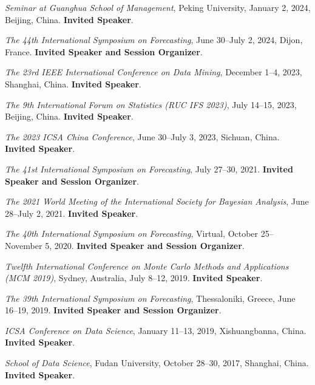 \documentclass[twoside,a4paper]{article}
\begin{document}
\begin{etaremune}[itemsep=0ex,parsep=0pt]
\item \textit{Seminar at Guanghua School of Management}, Peking University, January 2, 2024, Beijing, China. \textbf{Invited Speaker}.

\item \textit{The 44th International Symposium on Forecasting}, June 30--July 2, 2024, Dijon, France. \textbf{Invited Speaker and Session Organizer}.

\item \textit{The 23rd IEEE International Conference on Data Mining}, December 1--4, 2023, Shanghai, China. \textbf{Invited Speaker}.

\item \textit{The 9th International Forum on Statistics (RUC IFS 2023)}, July 14--15, 2023, Beijing, China. \textbf{Invited Speaker}.

\item \textit{The 2023 ICSA China Conference}, June 30--July 3, 2023, Sichuan, China. \textbf{Invited Speaker}.

\item \textit{The 41st International Symposium on Forecasting}, July 27--30, 2021. \textbf{Invited Speaker and Session Organizer}.

\item \textit{The 2021 World Meeting of the International Society for Bayesian Analysis}, June 28--July 2, 2021. \textbf{Invited Speaker}.

\item \textit{The 40th International Symposium on Forecasting}, Virtual, October 25--November 5, 2020. \textbf{Invited Speaker and Session Organizer}.

\item \textit{Twelfth International Conference on Monte Carlo Methods and Applications (MCM 2019)}, Sydney, Australia, July 8--12, 2019. \textbf{Invited Speaker}.

\item \textit{The 39th International Symposium on Forecasting}, Thessaloniki, Greece, June 16--19, 2019. \textbf{Invited Speaker and Session Organizer}.

\item \textit{ICSA Conference on Data Science}, January 11--13, 2019, Xishuangbanna, China. \textbf{Invited Speaker}.

\item \textit{School of Data Science}, Fudan University, October 28--30, 2017, Shanghai, China. \textbf{Invited Speaker}.


\end{etaremune}
\end{document}
